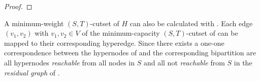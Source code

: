 \begin{proof}
%
\end{proof} 

A minimum-weight $(S,T)$-cutset of $H$ can also be calculated with . 
Each edge $(v_1,v_2)$ with $v_1,v_2 \in V$ of the minimum-capacity
$(S,T)$-cutset of  can be mapped to their corresponding hyperedge. 
Since there exists a one-one correspondence between the hypernodes
of  and  the corresponding bipartition are all hypernodes \emph{reachable}
from all nodes in $S$ and all not \emph{reachable} from $S$ in the \emph{residual graph}
of . 

